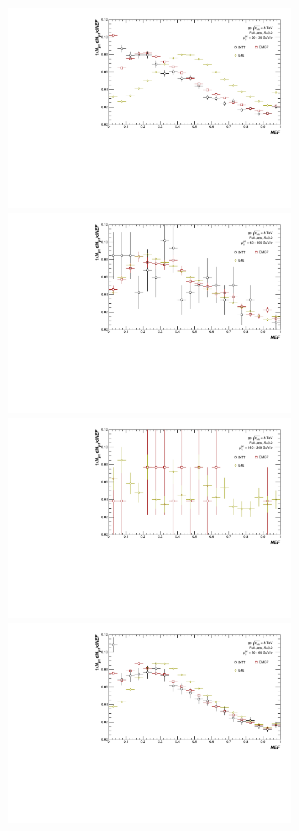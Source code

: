 \documentclass[ALICE]{ALICE_analysis_notes}
\begin{document}
\begin{figure}[h!]
    \centering
    \begin{multicols}{2}
            \includegraphics[width=7.5cm]{figures/NEF/All/hNEF_20-30GeV_R02.pdf}
            \includegraphics[width=7.5cm]{figures/NEF/All/hNEF_60-100GeV_R02.pdf}
            \includegraphics[width=7.5cm]{figures/NEF/All/hNEF_160-240GeV_R02.pdf}
        \vfill\null
        \columnbreak
            \includegraphics[width=7.5cm]{figures/NEF/All/hNEF_30-60GeV_R02.pdf}

\end{multicols}
\end{figure}
\end{document}
